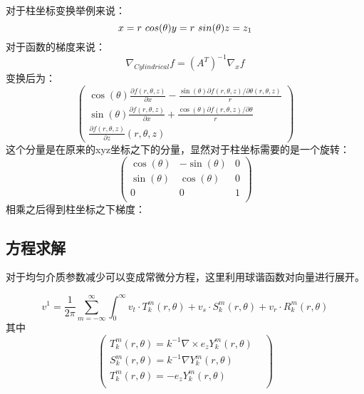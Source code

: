 \documentclass[UTF8]{article}
\begin{document}
对于柱坐标变换举例来说：
\begin{equation}
x=r \ cos(\theta)\\
y=r \ sin(\theta)\\
z=z_1
\end{equation}
对于函数的梯度来说：
\begin{equation}
\nabla_{Cylindrical} f=(A^T)^{-1}\nabla_x f
\end{equation}
变换后为：
\begin{equation}
\left(
\begin{array}{ccc}
\cos (\theta ) \frac{\partial f(r,\theta ,z)}{\partial x}-\frac{\sin (\theta ) {\partial f(r,\theta ,z)}/{\partial \theta}(r,\theta ,z)}{r}\\
\sin (\theta ) \frac{\partial f(r,\theta ,z)}{\partial x}+\frac{\cos (\theta ) {\partial f(r,\theta ,z)}/{\partial \theta}}{r}\\
\frac{\partial f(r,\theta,z)}{\partial z}(r,\theta ,z)
\end{array}
\right)
\end{equation}
这个分量是在原来的xyz坐标之下的分量，显然对于柱坐标需要的是一个旋转：
\begin{equation}
\left(
\begin{array}{ccc}
 \cos (\theta ) & -\sin (\theta ) & 0 \\
 \sin (\theta ) & \cos (\theta ) & 0 \\
 0 & 0 & 1 \\
\end{array}
\right)
\end{equation}
相乘之后得到柱坐标之下梯度：
\begin{equation}
[\frac{\partial f(r,\theta,z)}{\partial r},\frac{1}{r}\frac{\partial f(r,\theta,z)}{\partial r},\frac{\partial f(r,\theta,z)}{\partial r}]
\end{equation}

        \subsection{方程求解}
对于均匀介质参数减少可以变成常微分方程，这里利用球谐函数对向量进行展开。

\begin{equation}
v^1=\frac{1}{2\pi}\sum_{m=-\infty}^{\infty}\int_0^\infty{v_t\cdot T_k^m(r,\theta)+v_s\cdot S_k^m(r,\theta)+v_r\cdot R_k^m(r,\theta)}
\end{equation}
其中
\begin{equation}
\left(
\begin{array}{ccc}
        T^m_k(r,\theta)=k^{-1}\nabla\times e_z Y_k^m(r,\theta) & \\ 
        S^m_k(r,\theta)=k^{-1}\nabla Y_k^m(r,\theta) & \\ 
        T^m_k(r,\theta)=- e_z Y_k^m(r,\theta) & \\
\end{array}
\right)
\end{equation}
\end{document}
